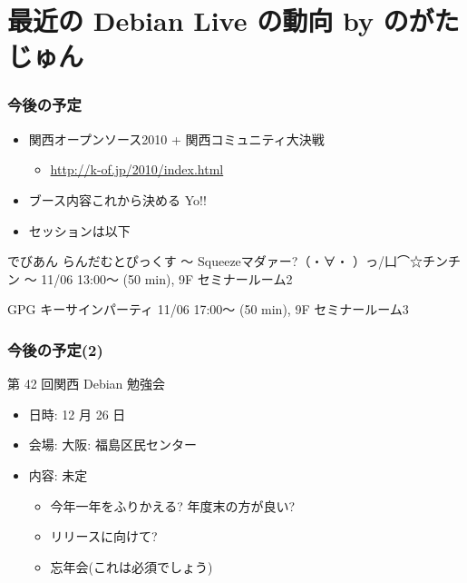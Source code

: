 \documentclass[cjk,dvipdfmx,12pt,%
hyperref={bookmarks=true,bookmarksnumbered=true,bookmarksopen=false,%
colorlinks=false,%
pdftitle={第40回 関西Debian勉強会},%
pdfauthor={倉敷・のがた・佐々木},%
pdfsubject={資料},%
}]{beamer}
\begin{document}
\section{最近の Debian Live の動向 by のがたじゅん}




\begin{frame}[fragile]
\frametitle{今後の予定}

\begin{itemize}
\item 関西オープンソース2010 + 関西コミュニティ大決戦

\begin{itemize}
\item \url{http://k-of.jp/2010/index.html}
\end{itemize}
\item ブース内容これから決める Yo!!
\item セッションは以下
\end{itemize}

\begin{block}{%
でびあん らんだむとぴっくす%
{\tiny{〜 Squeezeマダァー?（・∀・ ）っ/凵⌒☆チンチン 〜}}}
11/06 13:00〜 (50 min), 9F セミナールーム2
\end{block}
\begin{block}{GPG キーサインパーティ}
11/06 17:00〜 (50 min), 9F セミナールーム3
\end{block}


\end{frame}

\begin{frame}[fragile]
\frametitle{今後の予定(2)}


\begin{block}{第 42 回関西 Debian 勉強会}
\begin{itemize}
  \item 日時: 12 月 26 日
  \item 会場: 大阪: 福島区民センター
  \item 内容: 未定
  \begin{itemize}
    \item 今年一年をふりかえる? 年度末の方が良い?
    \item リリースに向けて?
    \item 忘年会(これは必須でしょう)
  \end{itemize}
\end{itemize}
\end{block}



\end{frame}



\takahashi[50]{　}
\end{document}
